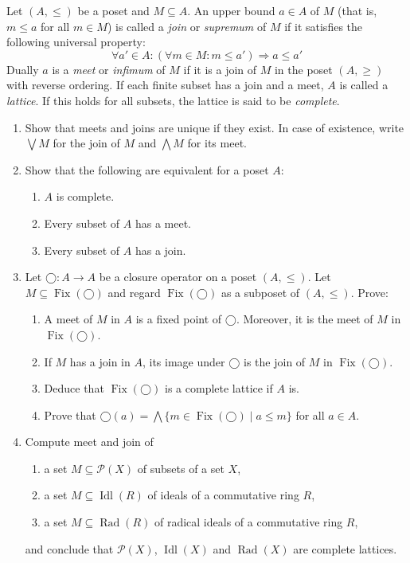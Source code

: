 \documentclass{exercises}
\DeclareMathOperator{\Idl}{Idl}
\DeclareMathOperator{\Rad}{Rad}
\DeclareMathOperator{\Fix}{Fix}
\begin{document}
\begin{exercise}
  Let $(A,≤)$ be a poset and $M⊆A$.
  An upper bound $a ∈ A$ of $M$ (that is, $m ≤ a$ for all $m ∈ M$) is called a \emph{join} or \emph{supremum} of $M$ if it satisfies the following universal property:
  $$
  ∀a' ∈ A: (∀m ∈ M:m ≤ a') ⇒ a ≤ a'
  $$
  Dually $a$ is a \emph{meet} or \emph{infimum} of $M$ if it is a join of $M$ in the poset $(A,≥)$ with reverse ordering.
  If each finite subset has a join and a meet, $A$ is called a \emph{lattice}.
  If this holds for all subsets, the lattice is said to be \emph{complete}.

  \begin{enumerate}
    \item Show that meets and joins are unique if they exist.  In case of existence, write $⋁ M$ for the join of $M$ and $⋀ M$ for its meet.
    \item Show that the following are equivalent for a poset $A$:
      \begin{enumerate}
        \item $A$ is complete.
        \item Every subset of $A$ has a meet.
        \item Every subset of $A$ has a join.
      \end{enumerate}
    \item Let $◯:A → A$ be a closure operator on a poset $(A,≤)$.
    Let $M⊆\Fix(◯)$ and regard $\Fix(◯)$ as a subposet of $(A,≤)$.
      Prove:
      \begin{enumerate}
        \item A meet of $M$ in $A$ is a fixed point of $◯$.
          Moreover, it is the meet of $M$ in $\Fix(◯)$.
        \item If $M$ has a join in $A$, its image under $◯$ is the join of $M$ in $\Fix(◯)$.
        \item Deduce that $\Fix(◯)$ is a complete lattice if $A$ is.
        \item Prove that $◯(a) = ⋀ \{m ∈ \Fix(◯) \mid a ≤ m\}$ for all $a ∈ A$.
      \end{enumerate}
    \item Compute meet and join of
      \begin{enumerate}
        \item a set $M⊆𝒫(X)$ of subsets of a set $X$,
        \item a set $M⊆\Idl(R)$ of ideals of a commutative ring $R$,
        \item a set $M⊆\Rad(R)$ of radical ideals of a commutative ring $R$,
      \end{enumerate}
      and conclude that $𝒫(X)$, $\Idl(X)$ and $\Rad(X)$ are complete lattices.
  \end{enumerate}
\end{exercise}
\end{document}
